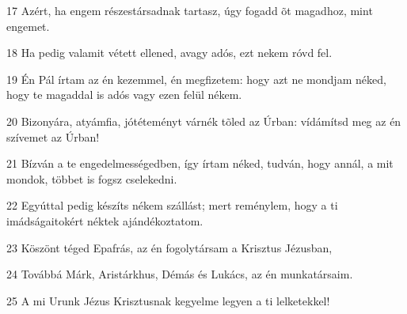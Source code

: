 \par 17 Azért, ha engem részestársadnak tartasz, úgy fogadd õt magadhoz, mint engemet.
\par 18 Ha pedig valamit vétett ellened, avagy adós, ezt nekem róvd fel.
\par 19 Én Pál írtam az én kezemmel, én megfizetem: hogy azt ne mondjam néked, hogy te magaddal is adós vagy ezen felül nékem.
\par 20 Bizonyára, atyámfia, jótéteményt várnék tõled az Úrban: vídámítsd meg az én szívemet az Úrban!
\par 21 Bízván a te engedelmességedben, így írtam néked, tudván, hogy annál, a mit mondok, többet is fogsz cselekedni.
\par 22 Egyúttal pedig készíts nékem szállást; mert reménylem, hogy a ti imádságaitokért néktek ajándékoztatom.
\par 23 Köszönt téged Epafrás, az én fogolytársam a Krisztus Jézusban,
\par 24 Továbbá Márk, Aristárkhus, Démás és Lukács, az én munkatársaim.
\par 25 A mi Urunk Jézus Krisztusnak kegyelme legyen a ti lelketekkel!


